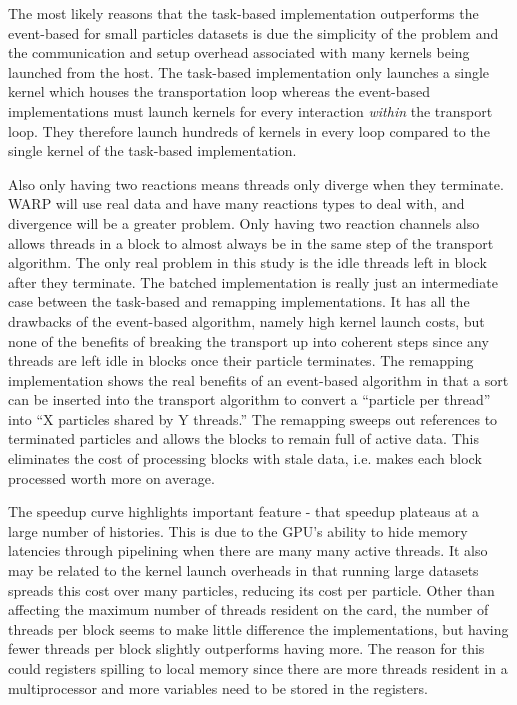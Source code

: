 The most likely reasons that the task-based implementation outperforms the event-based for small particles datasets is due the simplicity of the problem and the communication and setup overhead associated with many kernels being launched from the host.  The task-based implementation only launches a single kernel which houses the transportation loop whereas the event-based implementations must launch kernels for every interaction \emph{within} the transport loop.  They therefore launch hundreds of kernels in every loop compared to the single kernel of the task-based implementation.  

Also only having two reactions means threads only diverge when they terminate.  WARP will use real data and have many reactions types to deal with, and divergence will be a greater problem.  Only having two reaction channels also allows threads in a block to almost always be in the same step of the transport algorithm.  The only real problem in this study is the idle threads left in block after they terminate.  The batched implementation is really just an intermediate case between the task-based and remapping implementations.  It has all the drawbacks of the event-based algorithm, namely high kernel launch costs, but none of the benefits of breaking the transport up into coherent steps since any threads are left idle in blocks once their particle terminates.  The remapping implementation shows the real benefits of an event-based algorithm in that a sort can be inserted into the transport algorithm to convert a ``particle per thread'' into ``X particles shared by Y threads.''  The remapping sweeps out references to terminated particles and allows the blocks to remain full of active data.  This eliminates the cost of processing blocks with stale data, i.e. makes each block processed worth more on average.   

The speedup curve highlights important feature - that speedup plateaus at a large number of histories.  This is due to the GPU's ability to hide memory latencies through pipelining when there are many many active threads.  It also may be related to the kernel launch overheads in that running large datasets spreads this cost over many particles, reducing its cost per particle.  Other than affecting the maximum number of threads resident on the card, the number of threads per block seems to make little difference the implementations, but having fewer threads per block slightly outperforms having more.  The reason for this could registers spilling to local memory since there are more threads resident in a multiprocessor and more variables need to be stored in the registers.

